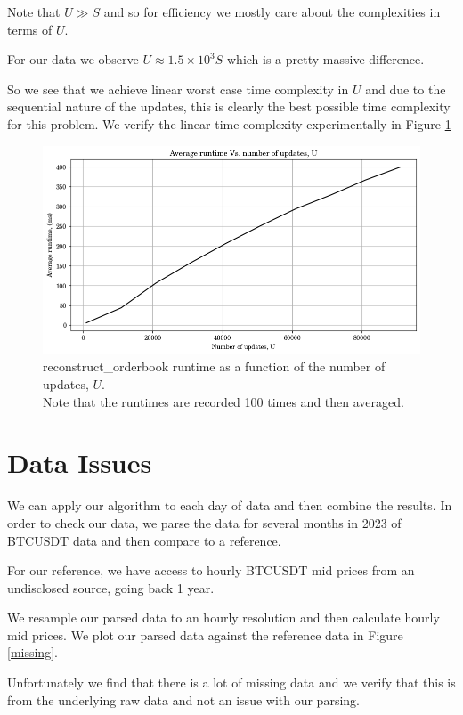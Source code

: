 \documentclass[a4paper, oneside, notitlepage]{book}
\begin{document}
Note that $U \gg S$ and so for efficiency we mostly care about the complexities in terms of $U$. 

For our data we observe $U \approx 1.5 \times 10^3 S$ which is a pretty massive difference.

So we see that we achieve linear worst case time complexity in $U$ and due to the
sequential nature of the updates, this is clearly the best possible time complexity for 
this problem. We verify the linear time complexity experimentally in Figure \ref{complexity}

\begin{figure}[htpb]
    \centering
    \includegraphics[width=1.0\textwidth]{./images/complexity.png}
    \caption{reconstruct\_orderbook runtime as a function of the number of updates, $U$.\\ Note that the runtimes are recorded 100 times and then averaged.}
    \label{complexity}
\end{figure}

\section{Data Issues}

We can apply our algorithm to each day of data and then combine the results.
In order to check our data, we parse the data for several months in 2023 of BTCUSDT data 
and then compare to a reference.

For our reference, we have access to hourly BTCUSDT mid prices from an undisclosed source,
going back 1 year.

We resample our parsed data to an hourly resolution and then calculate hourly mid prices.
We plot our parsed data against the reference data in Figure \ref{missing}.

Unfortunately we find that there is a lot of missing data and we verify that this
is from the underlying raw data and not an issue with our parsing.
\end{document}
